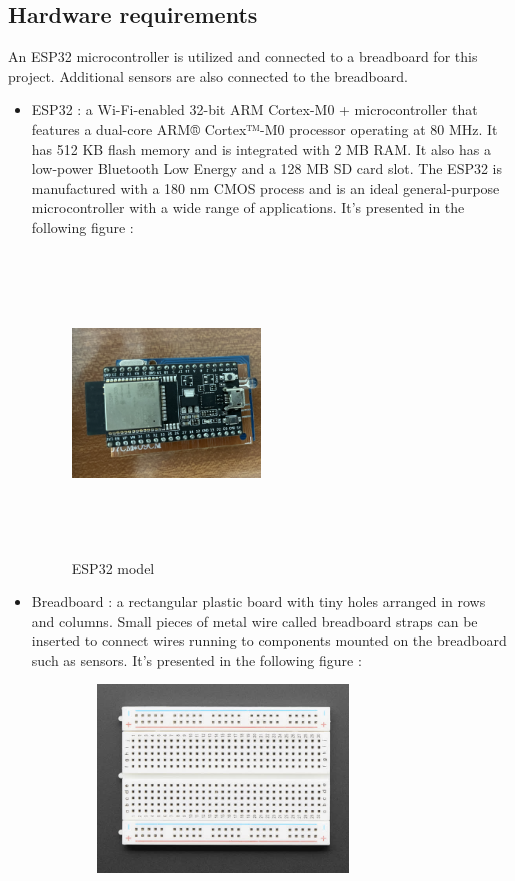 \documentclass{report}
\begin{document}
\subsection{Hardware requirements}
An ESP32 microcontroller is utilized and connected to a breadboard for this project. Additional sensors are also connected to the breadboard.\newpage
\begin{itemize}
    \item ESP32 : a Wi-Fi-enabled 32-bit ARM Cortex-M0 + microcontroller that features a dual-core ARM® Cortex™-M0 processor operating at 80 MHz. It has 512 KB flash memory and is integrated with 2 MB RAM. It also has a low-power Bluetooth Low Energy and a 128 MB SD card slot. The ESP32 is manufactured with a 180 nm CMOS process and is an ideal general-purpose microcontroller with a wide range of applications. It's presented in the following figure :
    \begin{figure}[h!]
  \centering
    \includegraphics[width=5cm, height=8cm, angle=90] {esp32.png}
    \caption{ESP32 model}
    \label{fig:my_label}
\end{figure}
    \item Breadboard : a rectangular plastic board with tiny holes arranged in rows and columns. Small pieces of metal wire called breadboard straps can be inserted to connect wires running to components mounted on the breadboard such as sensors. It's presented in the following figure :
    \begin{figure}[h!]
    \centering
    \includegraphics[width=8cm, height=5cm] {Breadboard.jpeg}

\end{figure}
\end{itemize}
\end{document}
